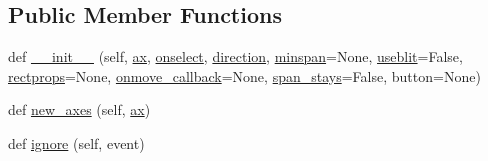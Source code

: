 \subsection*{Public Member Functions}
\begin{DoxyCompactItemize}
\item 
def \hyperlink{classmatplotlib_1_1widgets_1_1SpanSelector_ab22b5bf4635f88e6648794d393b3c4e0}{\+\_\+\+\_\+init\+\_\+\+\_\+} (self, \hyperlink{classmatplotlib_1_1widgets_1_1SpanSelector_aa8892b223c155d636534bd94c19afb16}{ax}, \hyperlink{classmatplotlib_1_1widgets_1_1__SelectorWidget_ad893af1ad010d595c7cce1106b48d854}{onselect}, \hyperlink{classmatplotlib_1_1widgets_1_1SpanSelector_a8d088006a62702b98be45481c8aec82e}{direction}, \hyperlink{classmatplotlib_1_1widgets_1_1SpanSelector_a5104df236cba524cff0b4e9ab8e10c63}{minspan}=None, \hyperlink{classmatplotlib_1_1widgets_1_1__SelectorWidget_a6d178ef2dd7ec61c11b18302de3f43bf}{useblit}=False, \hyperlink{classmatplotlib_1_1widgets_1_1SpanSelector_a2d3e724bbd1972ca638085908fd7640a}{rectprops}=None, \hyperlink{classmatplotlib_1_1widgets_1_1SpanSelector_ac5074f31aa549cb91d944d41db212a55}{onmove\+\_\+callback}=None, \hyperlink{classmatplotlib_1_1widgets_1_1SpanSelector_a50326a48b2ae33185e2d69134e7def56}{span\+\_\+stays}=False, button=None)
\item 
def \hyperlink{classmatplotlib_1_1widgets_1_1SpanSelector_aadd8ad216da5bef741fa102ff65d259a}{new\+\_\+axes} (self, \hyperlink{classmatplotlib_1_1widgets_1_1SpanSelector_aa8892b223c155d636534bd94c19afb16}{ax})
\item 
def \hyperlink{classmatplotlib_1_1widgets_1_1SpanSelector_a14b04d9b22c4bcd668d194a488b7b968}{ignore} (self, event)
\end{DoxyCompactItemize}
